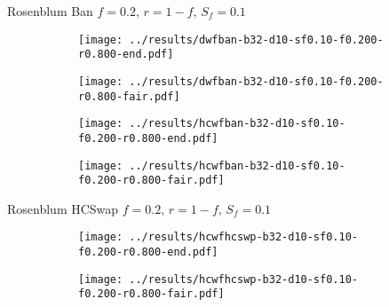 \documentclass[8pt,a4paper]{beamer}
\begin{document}
	
	
	
	\begin{frame}{Rosenblum Ban $f=0.2,\, r=1-f,\,S_f=0.1$}
		\begin{figure}
			\begin{subfigure}{.48\textwidth}
				\centering
				\texttt{[image: ../results/dwfban-b32-d10-sf0.10-f0.200-r0.800-end.pdf]}
			\end{subfigure}
			\begin{subfigure}{.48\textwidth}
				\centering
				\texttt{[image: ../results/dwfban-b32-d10-sf0.10-f0.200-r0.800-fair.pdf]}
			\end{subfigure}
		\end{figure}
		
		\begin{figure}
			\begin{subfigure}{.48\textwidth}
				\centering
				\texttt{[image: ../results/hcwfban-b32-d10-sf0.10-f0.200-r0.800-end.pdf]}
			\end{subfigure}
			\begin{subfigure}{.48\textwidth}
				\centering
				\texttt{[image: ../results/hcwfban-b32-d10-sf0.10-f0.200-r0.800-fair.pdf]}
			\end{subfigure}
		\end{figure}
	\end{frame}
	
	\begin{frame}{Rosenblum HCSwap $f=0.2,\, r=1-f,\,S_f=0.1$}
		\begin{figure}
			\begin{subfigure}{.48\textwidth}
				\centering
				\texttt{[image: ../results/hcwfhcswp-b32-d10-sf0.10-f0.200-r0.800-end.pdf]}
			\end{subfigure}
			\begin{subfigure}{.48\textwidth}
				\centering
				\texttt{[image: ../results/hcwfhcswp-b32-d10-sf0.10-f0.200-r0.800-fair.pdf]}
			\end{subfigure}
		\end{figure}
	\end{frame}
	
	
	
\end{document}
